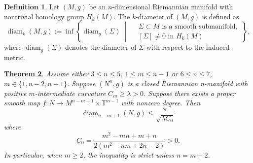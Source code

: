 \documentclass[11pt,letterpaper]{amsart}
\newtheorem{theorem}{Theorem}[section]
\theoremstyle{definition}
\newtheorem{definition}[theorem]{Definition}
\theoremstyle{remark}
\numberwithin{equation}{section}
\begin{document}
\begin{definition}
Let $(M,g)$ be an $n$-dimensional Riemannian manifold with nontrivial homology group $H_k(M)$. The $k$-diameter of $(M,g)$ is defined as
\begin{equation*}
    \operatorname{diam}_k(M,g) := \inf \left\{ \operatorname{diam}_g(\Sigma) \;\middle|\;
\begin{aligned}
&\Sigma \subset M \text{ is a smooth submanifold}, \\
&[\Sigma] \neq 0 \text{ in } H_k(M)
\end{aligned} \right\},
\end{equation*}
where $\operatorname{diam}_g(\Sigma)$ denotes the diameter of $\Sigma$ with respect to the induced metric.
\end{definition}
\begin{theorem}\label{diameter inequality in Cm case}
    Assume either \(3 \leq  n \leq  5\), \(1 \leq  m \leq  n-1\) or \(6 \leq  n \leq  7\), \(m\in \{1,n-2,n-1\}\). Suppose $(N^{n},g)$ is a closed Riemannian n-manifold with positive $m$-intermediate curvature $C_{m}\geq \lambda>0$. Suppose there exists a proper smooth map $f:N\rightarrow M^{n-m+1}\times \mathbb{T}^{m-1}$ with nonzero degree. Then
    $$\operatorname{diam}_{n-m+1}(N,g)\leq  \frac{\pi}{\sqrt{\lambda C_{0}}}$$ 
    where
\[
C_{0}=\frac{m^2-mn+m+n}{2(m^2-nm+2n-2)}>0.
\] 
In particular,  when $m\geq 2$, the inequality is strict unless $n=m+2$.
\end{theorem}
\end{document}
